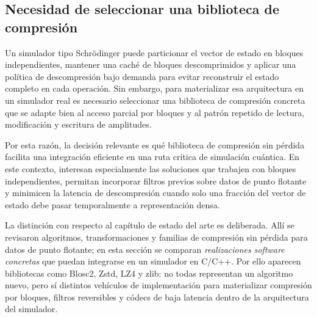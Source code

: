 \subsection{Necesidad de seleccionar una biblioteca de compresión}

Un simulador tipo Schrödinger puede
particionar el vector de estado en bloques independientes, mantener una caché de bloques descomprimidos y
aplicar una política de descompresión bajo demanda para evitar reconstruir el estado completo en cada operación.
Sin embargo, para materializar esa arquitectura en un simulador real es necesario seleccionar una biblioteca
de compresión concreta que se adapte bien al acceso parcial por bloques y al patrón repetido de lectura,
modificación y escritura de amplitudes.

Por esta razón, la decisión relevante es qué biblioteca de compresión sin pérdida facilita 
una integración eficiente en una ruta crítica de simulación cuántica. En este contexto, interesan
especialmente las soluciones que trabajen con bloques independientes, permitan incorporar filtros previos sobre
datos de punto flotante y minimicen la latencia de descompresión cuando solo una fracción del vector de estado
debe pasar temporalmente a representación densa.

La distinción con respecto al capítulo de estado del arte es deliberada. Allí se revisaron algoritmos, transformaciones y familias de compresión sin pérdida para datos de punto flotante; en esta sección se comparan \emph{realizaciones software concretas} que puedan integrarse en un simulador en C/C++. Por ello aparecen bibliotecas como Blosc2, Zstd, LZ4 y zlib: no todas representan un algoritmo nuevo, pero sí distintos vehículos de implementación para materializar compresión por bloques, filtros reversibles y códecs de baja latencia dentro de la arquitectura del simulador.